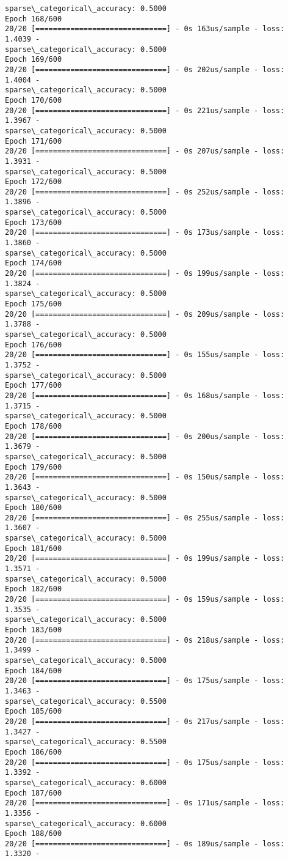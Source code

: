 \documentclass[11pt]{article}
\begin{document}
\begin{Verbatim}[commandchars=\\\{\}]
sparse\_categorical\_accuracy: 0.5000
Epoch 168/600
20/20 [==============================] - 0s 163us/sample - loss: 1.4039 -
sparse\_categorical\_accuracy: 0.5000
Epoch 169/600
20/20 [==============================] - 0s 202us/sample - loss: 1.4004 -
sparse\_categorical\_accuracy: 0.5000
Epoch 170/600
20/20 [==============================] - 0s 221us/sample - loss: 1.3967 -
sparse\_categorical\_accuracy: 0.5000
Epoch 171/600
20/20 [==============================] - 0s 207us/sample - loss: 1.3931 -
sparse\_categorical\_accuracy: 0.5000
Epoch 172/600
20/20 [==============================] - 0s 252us/sample - loss: 1.3896 -
sparse\_categorical\_accuracy: 0.5000
Epoch 173/600
20/20 [==============================] - 0s 173us/sample - loss: 1.3860 -
sparse\_categorical\_accuracy: 0.5000
Epoch 174/600
20/20 [==============================] - 0s 199us/sample - loss: 1.3824 -
sparse\_categorical\_accuracy: 0.5000
Epoch 175/600
20/20 [==============================] - 0s 209us/sample - loss: 1.3788 -
sparse\_categorical\_accuracy: 0.5000
Epoch 176/600
20/20 [==============================] - 0s 155us/sample - loss: 1.3752 -
sparse\_categorical\_accuracy: 0.5000
Epoch 177/600
20/20 [==============================] - 0s 168us/sample - loss: 1.3715 -
sparse\_categorical\_accuracy: 0.5000
Epoch 178/600
20/20 [==============================] - 0s 200us/sample - loss: 1.3679 -
sparse\_categorical\_accuracy: 0.5000
Epoch 179/600
20/20 [==============================] - 0s 150us/sample - loss: 1.3643 -
sparse\_categorical\_accuracy: 0.5000
Epoch 180/600
20/20 [==============================] - 0s 255us/sample - loss: 1.3607 -
sparse\_categorical\_accuracy: 0.5000
Epoch 181/600
20/20 [==============================] - 0s 199us/sample - loss: 1.3571 -
sparse\_categorical\_accuracy: 0.5000
Epoch 182/600
20/20 [==============================] - 0s 159us/sample - loss: 1.3535 -
sparse\_categorical\_accuracy: 0.5000
Epoch 183/600
20/20 [==============================] - 0s 218us/sample - loss: 1.3499 -
sparse\_categorical\_accuracy: 0.5000
Epoch 184/600
20/20 [==============================] - 0s 175us/sample - loss: 1.3463 -
sparse\_categorical\_accuracy: 0.5500
Epoch 185/600
20/20 [==============================] - 0s 217us/sample - loss: 1.3427 -
sparse\_categorical\_accuracy: 0.5500
Epoch 186/600
20/20 [==============================] - 0s 175us/sample - loss: 1.3392 -
sparse\_categorical\_accuracy: 0.6000
Epoch 187/600
20/20 [==============================] - 0s 171us/sample - loss: 1.3356 -
sparse\_categorical\_accuracy: 0.6000
Epoch 188/600
20/20 [==============================] - 0s 189us/sample - loss: 1.3320 -

\end{Verbatim}
\end{document}
